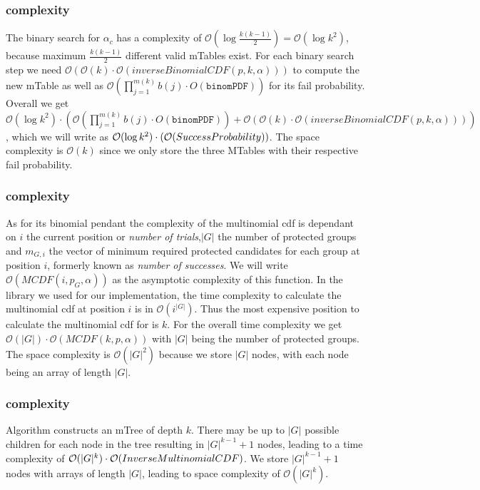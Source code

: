 \subsubsection{\algoBinomBinary complexity}\label{subsubsec:binom-binary-complexity}
The binary search for $\alpha_c$ has a complexity of $\mathcal{O}(\log{}\frac{k(k-1)}{2}) = \mathcal{O}(\log{}k^2)$, because maximum $\frac{k(k-1)}{2}$ different valid mTables exist.
%
For each binary search step we need $\mathcal{O}(\mathcal{O}(k) \cdot \mathcal{O}(inverseBinomialCDF(p,k,\alpha)))$ to compute the new mTable as well as $\mathcal{O}(\prod_{j=1}^{m(k)}b(j) \cdot O(\texttt{binomPDF}))$ for its fail probability.
%
Overall we get $\mathcal{O}(\log{}k^2) \cdot (\mathcal{O}(\prod_{j=1}^{m(k)}b(j) \cdot O(\texttt{binomPDF})) + \mathcal{O}(\mathcal{O}(k) \cdot \mathcal{O}(inverseBinomialCDF(p,k,\alpha))))$, which we will write as $\mathcal{O}(\log{}k^2) \cdot (\mathcal{O}({\sc SuccessProbability}))$. 
%
The space complexity is $\mathcal{O}(k)$ since we only store the three MTables with their respective fail probability.
%
\subsubsection{\algoImcdf complexity}\label{subsubsec:imcdf-complexity}
As for its binomial pendant the complexity of the multinomial cdf is dependant on $i$ the current position or \textit{number of trials},$|G|$ the number of protected groups and $m_{G,i}$ the vector of minimum required protected candidates for each group at position $i$, formerly known as \textit{number of successes}.
%
We will write $\mathcal{O}(MCDF(i,p_G,\alpha))$ as the asymptotic complexity of this function. In the library we used for our implementation, the time complexity to calculate the multinomial cdf at position $i$ is in $\mathcal{O}(i^{|G|})$. Thus the most expensive position to calculate the multinomial cdf for is $k$.
%
For the overall time complexity we get $\mathcal{O}(|G|) \cdot \mathcal{O}(MCDF(k,p,\alpha ))$ with $|G|$ being the number of protected groups. 
%
The space complexity is $\mathcal{O}(|G|^2)$ because we store $|G|$ nodes, with each node being an array of length $|G|$.
%
\subsubsection{\algoComputeMTree complexity}\label{subsubsec:mtree-complexity}
Algorithm \algoComputeMTree constructs an mTree of depth $k$. 
%
There may be up to $|G|$ possible children for each node in the tree resulting in $|G|^{k-1} +1$ nodes, leading to a time complexity of $\mathcal{O}(|G|^{k}) \cdot \mathcal{O}({\sc InverseMultinomialCDF})$.
%
We store $|G|^{k-1} +1$ nodes with arrays of length $|G|$, leading to space complexity of $\mathcal{O}(|G|^{k})$.
%
